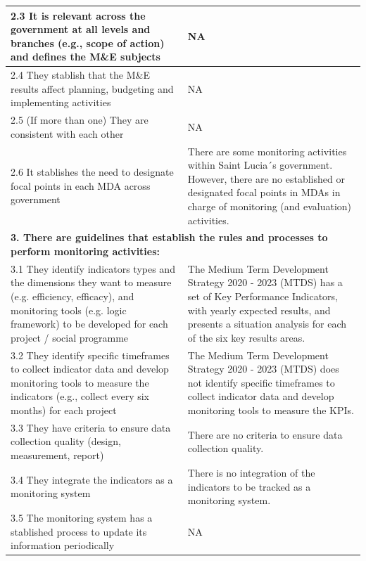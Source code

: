 \documentclass[
  10pt,
]{book}
\begin{document}
\begin{table}
\begin{tabular}[t]{l|l}
\hline
\hspace{1em}2.3 It is relevant across the government at all levels and branches (e.g., scope of action) and defines the M\&E subjects & NA\\
\hline
\hspace{1em}2.4 They stablish that the M\&E results affect planning, budgeting and implementing activities & NA\\
\hline
\hspace{1em}2.5 (If more than one) They are consistent with each other & NA\\
\hline
\hspace{1em}2.6 It stablishes the need to designate focal points in each MDA across government & There are some monitoring activities within Saint Lucia´s government. However, there are no established or designated focal points in MDAs in charge of monitoring (and evaluation) activities.\\
\hline
\multicolumn{2}{l}{\textbf{3. There are guidelines that establish the rules and processes to perform monitoring activities:}}\\
\hline
\hspace{1em}3.1 They identify indicators types and the dimensions they want to measure (e.g. efficiency, efficacy), and monitoring tools (e.g. logic framework) to be developed for each project / social programme & The Medium Term Development Strategy 2020 - 2023 (MTDS) has a set of Key Performance Indicators, with yearly expected results, and presents a situation analysis for each of the six key results areas.\\
\hline
\hspace{1em}3.2 They identify specific timeframes to collect indicator data and develop monitoring tools to measure the indicators (e.g., collect every six months) for each project & The Medium Term Development Strategy 2020 - 2023 (MTDS) does not identify specific timeframes to collect indicator data and develop monitoring tools to measure the KPIs.\\
\hline
\hspace{1em}3.3 They have criteria to ensure data collection quality (design, measurement, report) & There are no criteria to ensure data collection quality.\\
\hline
\hspace{1em}3.4 They integrate the indicators as a monitoring system & There is no integration of the indicators to be tracked as a monitoring system.\\
\hline
\hspace{1em}3.5 The monitoring system has a stablished process to update its information periodically & NA\\

\end{tabular}
\end{table}
\end{document}
